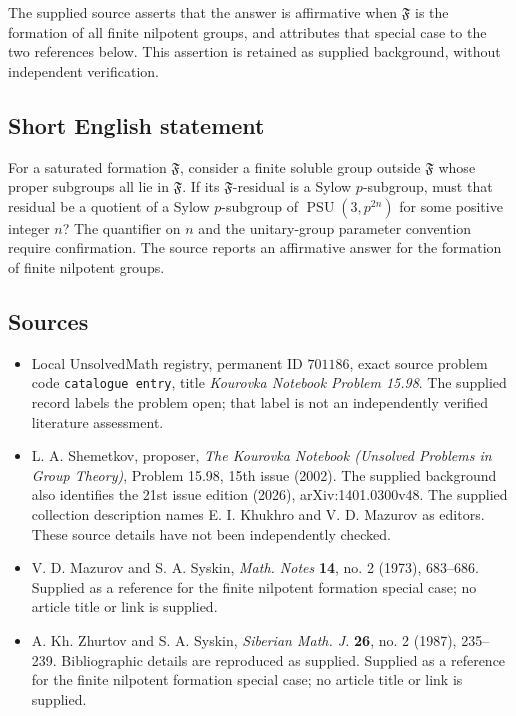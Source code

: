 \documentclass[11pt]{article}
\begin{document}
The supplied source asserts that the answer is affirmative when \(\mathfrak F\) is the formation of all finite nilpotent groups, and attributes that special case to the two references below. This assertion is retained as supplied background, without independent verification.
\subsection{Short English statement}
For a saturated formation \(\mathfrak F\), consider a finite soluble group outside \(\mathfrak F\) whose proper subgroups all lie in \(\mathfrak F\). If its \(\mathfrak F\)-residual is a Sylow \(p\)-subgroup, must that residual be a quotient of a Sylow \(p\)-subgroup of \(\operatorname{PSU}(3,p^{2n})\) for some positive integer \(n\)? The quantifier on \(n\) and the unitary-group parameter convention require confirmation. The source reports an affirmative answer for the formation of finite nilpotent groups.
\subsection{Sources}
\begin{itemize}
\item Local UnsolvedMath registry, permanent ID \(701186\), exact source problem code \texttt{catalogue entry}, title \emph{Kourovka Notebook Problem 15.98}. The supplied record labels the problem open; that label is not an independently verified literature assessment.
\item L. A. Shemetkov, proposer, \emph{The Kourovka Notebook (Unsolved Problems in Group Theory)}, Problem 15.98, 15th issue (2002). The supplied background also identifies the 21st issue edition (2026), arXiv:1401.0300v48. The supplied collection description names E. I. Khukhro and V. D. Mazurov as editors. These source details have not been independently checked.
\item V. D. Mazurov and S. A. Syskin, \emph{Math. Notes} \textbf{14}, no. 2 (1973), 683--686. Supplied as a reference for the finite nilpotent formation special case; no article title or link is supplied.
\item A. Kh. Zhurtov and S. A. Syskin, \emph{Siberian Math. J.} \textbf{26}, no. 2 (1987), 235--239. Bibliographic details are reproduced as supplied. Supplied as a reference for the finite nilpotent formation special case; no article title or link is supplied.
\end{itemize}
\end{document}
